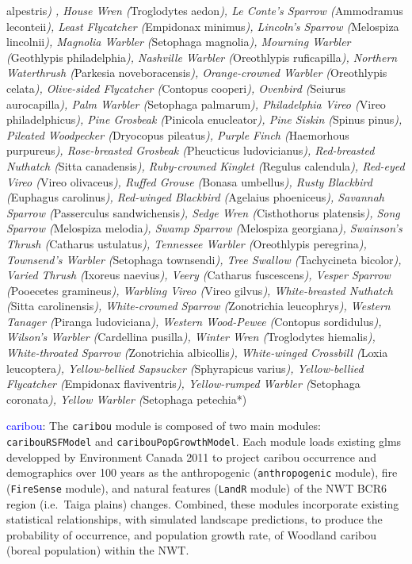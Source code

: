 \documentclass[]{article}
\begin{document}
alpestris\emph{) , House Wren (}Troglodytes aedon\emph{), Le Conte's
Sparrow (}Ammodramus leconteii\emph{), Least Flycatcher (}Empidonax
minimus\emph{), Lincoln's Sparrow (}Melospiza lincolnii\emph{), Magnolia
Warbler (}Setophaga magnolia\emph{), Mourning Warbler (}Geothlypis
philadelphia\emph{), Nashville Warbler (}Oreothlypis ruficapilla\emph{),
Northern Waterthrush (}Parkesia noveboracensis\emph{), Orange-crowned
Warbler (}Oreothlypis celata\emph{), Olive-sided Flycatcher (}Contopus
cooperi\emph{), Ovenbird (}Seiurus aurocapilla\emph{), Palm Warbler
(}Setophaga palmarum\emph{), Philadelphia Vireo (}Vireo
philadelphicus\emph{), Pine Grosbeak (}Pinicola enucleator\emph{), Pine
Siskin (}Spinus pinus\emph{), Pileated Woodpecker (}Dryocopus
pileatus\emph{), Purple Finch (}Haemorhous purpureus\emph{),
Rose-breasted Grosbeak (}Pheucticus ludovicianus\emph{), Red-breasted
Nuthatch (}Sitta canadensis\emph{), Ruby-crowned Kinglet (}Regulus
calendula\emph{), Red-eyed Vireo (}Vireo olivaceus\emph{), Ruffed Grouse
(}Bonasa umbellus\emph{), Rusty Blackbird (}Euphagus carolinus\emph{),
Red-winged Blackbird (}Agelaius phoeniceus\emph{), Savannah Sparrow
(}Passerculus sandwichensis\emph{), Sedge Wren (}Cisthothorus
platensis\emph{), Song Sparrow (}Melospiza melodia\emph{), Swamp Sparrow
(}Melospiza georgiana\emph{), Swainson's Thrush (}Catharus
ustulatus\emph{), Tennessee Warbler (}Oreothlypis peregrina\emph{),
Townsend's Warbler (}Setophaga townsendi\emph{), Tree Swallow
(}Tachycineta bicolor\emph{), Varied Thrush (}Ixoreus naevius\emph{),
Veery (}Catharus fuscescens\emph{), Vesper Sparrow (}Pooecetes
gramineus\emph{), Warbling Vireo (}Vireo gilvus\emph{), White-breasted
Nuthatch (}Sitta carolinensis\emph{), White-crowned Sparrow
(}Zonotrichia leucophrys\emph{), Western Tanager (}Piranga
ludoviciana\emph{), Western Wood-Pewee (}Contopus sordidulus\emph{),
Wilson's Warbler (}Cardellina pusilla\emph{), Winter Wren (}Troglodytes
hiemalis\emph{), White-throated Sparrow (}Zonotrichia albicollis\emph{),
White-winged Crossbill (}Loxia leucoptera\emph{), Yellow-bellied
Sapsucker (}Sphyrapicus varius\emph{), Yellow-bellied Flycatcher
(}Empidonax flaviventris\emph{), Yellow-rumped Warbler (}Setophaga
coronata\emph{), Yellow Warbler (}Setophaga petechia*)

\textcolor{blue}{caribou}: The \texttt{caribou} module is composed of
two main modules: \texttt{caribouRSFModel} and
\texttt{caribouPopGrowthModel}. Each module loads existing glms
developped by Environment Canada 2011 to project caribou occurrence and
demographics over 100 years as the anthropogenic (\texttt{anthropogenic}
module), fire (\texttt{FireSense} module), and natural features
(\texttt{LandR} module) of the NWT BCR6 region (i.e.~Taiga plains)
changes. Combined, these modules incorporate existing statistical
relationships, with simulated landscape predictions, to produce the
probability of occurrence, and population growth rate, of Woodland
caribou (boreal population) within the NWT.
\end{document}
